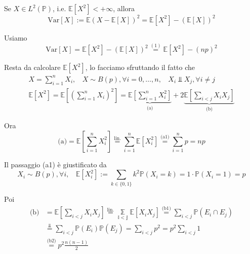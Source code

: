 \begin{enumerate}
Se $X\in L^{2}(\mathbb{P})$, i.e. $\mathbb{E}\left[ X^{2}\right] < +\infty $, allora\begin{equation*}
\mathrm{Var}[ X] :=\mathbb{E}( X-\mathbb{E}[ X])^{2} =\mathbb{E}\left[ X^{2}\right] -(\mathbb{E}[ X])^{2}
\end{equation*}

Usiamo\begin{equation*}
\mathrm{Var}[ X] =\mathbb{E}\left[ X^{2}\right] -(\mathbb{E}[ X])^{2}\overset{( 1)}{=}\mathbb{E}\left[ X^{2}\right] -( np)^{2}
\end{equation*}

Resta da calcolare $\mathbb{E}\left[ X^{2}\right]$, lo facciamo sfruttando il fatto che\begin{gather*}
X=\sum\limits _{i=1}^{n} X_{i} ,\ \ \ \ X\sim B( p) ,\forall i=0,\dotsc ,n,\ \ \ \ X_{i} \Bot X_{j} ,\forall i\neq j\\
\mathbb{E}\left[ X^{2}\right] =\mathbb{E}\left[\left(\sum\limits _{i=1}^{n} X_{i}\right)^{2}\right] =\underbrace{\mathbb{E}\left[\sum\limits _{i=1}^{n} X_{i}^{2}\right]}_{\text{(a)}} +2\underbrace{\mathbb{E}\left[\sum\limits _{i< j} X_{i} X_{j}\right]}_{\text{(b)}}
\end{gather*}

Ora\begin{equation*}
\text{(a)} =\mathbb{E}\left[\sum\limits _{i=1}^{n} X_{i}^{2}\right]\overset{\text{lin.}}{=}\sum\limits _{i=1}^{n}\mathbb{E}\left[ X_{i}^{2}\right]\overset{\text{(a1)}}{=}\sum\limits _{i=1}^{n} p=np
\end{equation*}

Il passaggio (a1) è giustificato da\begin{equation*}
X_{i} \sim B( p) ,\forall i,\ \ \ \ \mathbb{E}\left[ X_{i}^{2}\right] :=\sum\limits _{k\in \{0,1\}} k^{2}\mathbb{P}( X_{i} =k) =1\cdotp \mathbb{P}( X_{i} =1) =p
\end{equation*}

Poi\begin{equation*}
\begin{aligned}
\text{(b)} & =\mathbb{E}\left[\sum\limits _{i< j} X_{i} X_{j}\right]\overset{\text{lin.}}{=}\mathbb{\sum\limits _{i< j} E}[ X_{i} X_{j}]\overset{\text{(b1)}}{=}\sum\limits _{i< j}\mathbb{P}( E_{i} \cap E_{j})\\
 & \overset{\Bot }{=}\sum\limits _{i< j}\mathbb{P}( E_{i})\mathbb{P}( E_{j}) =\sum\limits _{i< j} p^{2} =p^{2}\sum\limits _{i< j} 1\\
 & \overset{\text{(b2)}}{=} p^{2}\frac{n( n-1)}{2}
\end{aligned}
\end{equation*}


\end{enumerate}
